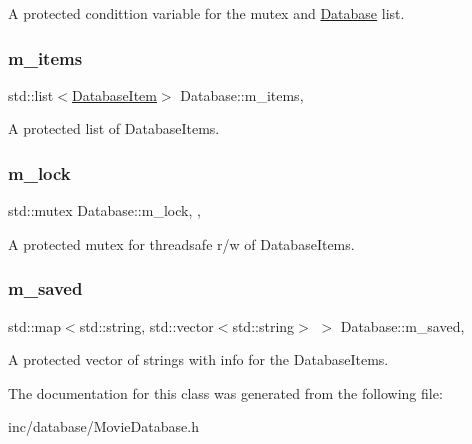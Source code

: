 A protected condittion variable for the mutex and \hyperlink{classDatabase}{Database} list. 

\mbox{\label{classDatabase_a5a4ac1f3bf0f5fd77a696174ad9e5c45}} 
\subsubsection{\texorpdfstring{m\+\_\+items}{m\_items}}
{\footnotesize\ttfamily std\+::list$<$\hyperlink{classDatabaseItem}{Database\+Item}$>$ Database\+::m\+\_\+items\hspace{0.3cm}{\ttfamily [protected]}, {\ttfamily [inherited]}}



A protected list of Database\+Items. 

\mbox{\label{classDatabase_a7f55f3a5d93c9694ee4f08a2f2135b1d}} 
\subsubsection{\texorpdfstring{m\+\_\+lock}{m\_lock}}
{\footnotesize\ttfamily std\+::mutex Database\+::m\+\_\+lock\hspace{0.3cm}{\ttfamily [mutable]}, {\ttfamily [protected]}, {\ttfamily [inherited]}}



A protected mutex for threadsafe r/w of Database\+Items. 

\mbox{\label{classDatabase_a9f87cbe5a1be71d541083dffa8d8c9ad}} 
\subsubsection{\texorpdfstring{m\+\_\+saved}{m\_saved}}
{\footnotesize\ttfamily std\+::map$<$std\+::string, std\+::vector$<$std\+::string$>$ $>$ Database\+::m\+\_\+saved\hspace{0.3cm}{\ttfamily [protected]}, {\ttfamily [inherited]}}



A protected vector of strings with info for the Database\+Items. 



The documentation for this class was generated from the following file\+:\begin{DoxyCompactItemize}
\item 
inc/database/Movie\+Database.\+h\end{DoxyCompactItemize}
